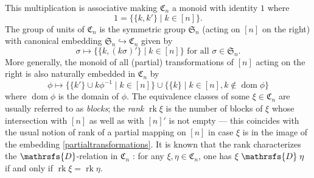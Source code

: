 \documentclass[11pt,reqno]{amsart}
\DeclareMathOperator{\dom}{dom} \DeclareMathOperator{\ran}{ran}
\DeclareMathOperator{\rk}{rk} \DeclareMathOperator{\tr}{tr}
\numberwithin{equation}{section}
\theoremstyle{remark}
\def\Dc{\mathrsfs{D}}
\def\si{\sigma}
\def\C{\mathfrak{C}}
\def\Sim{\mathfrak{S}}
\begin{document}
This multiplication is associative making $\C_n$ a monoid with
identity $1$ where
$$1=\{\{k,k'\}\mid k\in [n]\}.$$
The group of units of $\C_n$ is the symmetric group $\Sim_n$
(acting on $[n]$ on the right) with canonical embedding
$\Sim_n\hookrightarrow \C_n$ given by
$$\sigma\mapsto \{\{k,(k\si)'\}\mid k\in [n]\} \text{ for all } \si\in
\Sim_n.$$ More generally, the monoid of all (partial)
transformations of $[n]$ acting on the right is also naturally
embedded in $\C_n$ by
\begin{equation}
\label{partialtransformations} \phi\mapsto \{\{k'\}\cup
k\phi^{-1}\mid k\in [n]\}\cup\{\{k\}\mid k\in [n],k\notin\dom
\phi\}
\end{equation}
where $\dom \phi$ is the domain of $\phi$. The equivalence classes
of some $\xi\in \C_n$ are usually referred to as \emph{blocks};
the \emph{rank} $\rk\xi$ is the number of blocks of $\xi$ whose
intersection with $[n]$ as well as with $[n]'$ is not empty ---
this coincides with the usual notion of rank of a partial mapping
on $[n]$ in case $\xi$ is in the image of the embedding
\eqref{partialtransformations}. It is  known that the rank
characterizes the $\Dc$-relation in $\C_n$ \cite{Maz1,KM2}: for
any $\xi,\eta\in\C_n$, one has $\xi\mathrel{\Dc}\eta$ if and only
if $\rk\xi=\rk\eta$.
\end{document}
